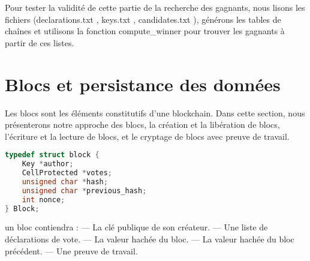 \documentclass{article}
\begin{document}
Pour tester la validité de cette partie de la recherche des gagnants, nous lisons les fichiers (declarations.txt , keys.txt , candidates.txt ), générons les tables de chaînes et utilisons la fonction compute_winner pour trouver les gagnants à partir de ces listes.
\section{Blocs et persistance des données}
Les blocs sont les éléments constitutifs d'une blockchain. Dans cette section, nous présenterons notre approche des blocs, la création et la libération de blocs, l'écriture et la lecture de blocs, et le cryptage de blocs avec preuve de travail.\newline
{}
\begin{lstlisting}[language={C}]
typedef struct block {
    Key *author;
    CellProtected *votes;
    unsigned char *hash;
    unsigned char *previous_hash;
    int nonce;
} Block;
\end{lstlisting}
un bloc contiendra :\newline
— La clé publique de son créateur.\newline
— Une liste de déclarations de vote.\newline
— La valeur hachée du bloc.\newline
— La valeur hachée du bloc précédent.\newline
— Une preuve de travail.\newline
\end{document}
